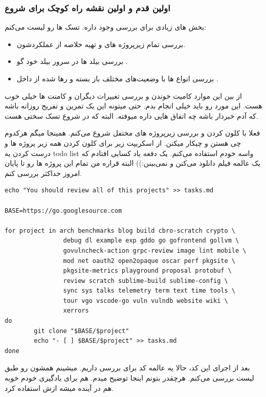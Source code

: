 \subsubsection{اولین قدم و اولین نقشه راه کوچک برای شروع}
بخش های زیادی برای بررسی وجود داره. تسک ها رو لیست می‌کنم:
\begin{itemize}
\item
بررسی تمام زیرپروژه های
و تهیه خلاصه از عملکردشون.
\item
بررسی بیلد ها در سرور بیلد خود گو
.
\item
بررسی انواع \cl ها با وضعیت‌های مختلف باز بسته و رها شده از داخل 
.
\end{itemize}

از بین این موارد کامیت خوندن و بررسی تغییرات دیگران و کامنت ها خیلی خوب هست. این مورد رو باید خیلی انجام بدم.
حتی میتونه این یک تمرین و تفریح روزانه باشه که آدم خبردار باشه چه اتفاق هایی داره میوفته. البته که در شروع تسک سختی هست.

فعلا با کلون کردن و بررسی زیرپروژه های مختفل شروع می‌کنم. همینجا میگم هرکدوم چی هستن و چیکار میکنن.
از اسکریپت زیر برای کلون کردن همه زیر پروژه ها و درست کردن یه todo list واسه خودم استفاده می‌کنم. یک دفعه یاد کسایی افتادم
که یک عالمه فیلم دانلود می‌کنن و نمی‌بینن:)) البته قراره من تمام این پروژه ها رو تا پایان امروز حداکثر بررسی کنم.

\begin{latin}
\begin{verbatim}
echo "You should review all of this projects" >> tasks.md

BASE=https://go.googlesource.com

for project in arch benchmarks blog build cbro-scratch crypto \
                debug dl example exp gddo go gofrontend gollvm \
                govulncheck-action grpc-review image lint mobile \
                mod net oauth2 open2opaque oscar perf pkgsite \
                pkgsite-metrics playground proposal protobuf \
                review scratch sublime-build sublime-config \
                sync sys talks telemetry term text time tools \
                tour vgo vscode-go vuln vulndb website wiki \
                xerrors
do
        git clone "$BASE/$project"
        echo "- [ ] $BASE/$project" >> tasks.md
done
\end{verbatim}
\end{latin}
بعد از اجرای این کد، حالا یه عالمه کد برای بررسی داریم. میشینم همشون رو طبق لیست بررسی می‌کنم. هرچقدر بتونم اینجا توضیح میدم.
هم برای یادگیری خودم خوبه هم در آینده میشه ازش استفاده کرد.

